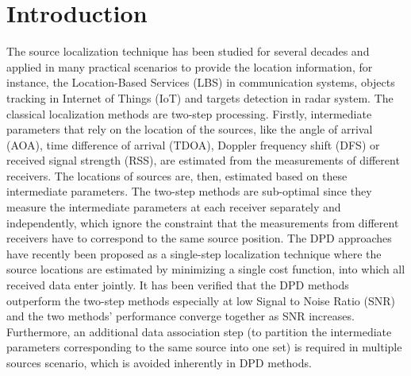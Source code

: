 \documentclass[review]{elsarticle}
\begin{document}
\section{Introduction}
The source localization technique has been studied for several decades and applied in many practical scenarios to provide the location information, for instance, the Location-Based Services (LBS) in communication systems, objects tracking in Internet of Things (IoT) and targets detection in radar system. 
The classical localization methods are two-step processing. Firstly, intermediate parameters that rely on the location of the sources, like the angle of arrival (AOA), time difference of arrival (TDOA), Doppler frequency shift (DFS) or received signal strength (RSS), are estimated from the measurements of different receivers. The locations of sources are, then, estimated based on these intermediate parameters. The two-step methods are sub-optimal since they measure the intermediate parameters at each receiver separately and independently, which ignore the constraint that the measurements from different receivers have to correspond to the same source position. 
The DPD approaches have recently been proposed as a single-step localization technique where the source locations are estimated by minimizing a single cost function, into which all received data enter jointly. It has been verified that the DPD methods outperform the two-step methods especially at low Signal to Noise Ratio (SNR) and the two methods' performance converge together as SNR increases. Furthermore, an additional data association step (to partition the intermediate parameters corresponding to the same source into one set) is required in multiple sources scenario, which is avoided inherently in DPD methods. 
\end{document}
